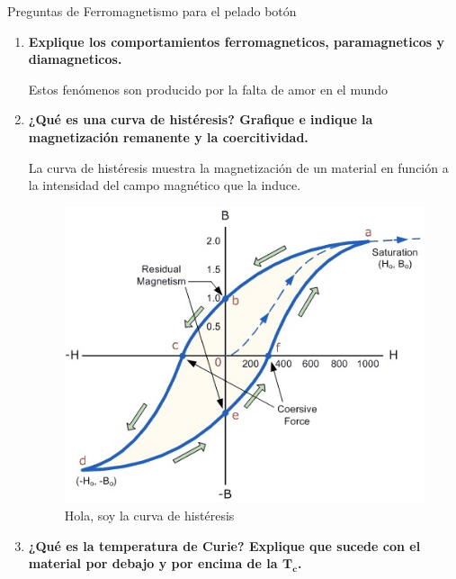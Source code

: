 \documentclass[a4paper,10pt,fleqn,oneside]{article}
\begin{document}


\bigskip
\noindent
\centering
Preguntas de Ferromagnetismo para el pelado botón


\begin{enumerate}[1.]
	\item \textbf{Explique los comportamientos ferromagneticos, paramagneticos y diamagneticos.}
		 
		 Estos fenómenos son producido por la falta de amor en el mundo 
	\item \textbf{¿Qué es una curva de histéresis? Grafique e indique la magnetización remanente y la coercitividad.}
	
		La curva de histéresis muestra la magnetización de un material en función a la intensidad del campo magnético que la induce.

\begin{figure}[h]
	\centering
	\includegraphics[scale=0.5]{histeresis.jpg}
	\caption{Hola, soy la curva de histéresis}
	\label{CH}
\end{figure}		
		
	\item \textbf{¿Qué es la temperatura de Curie? Explique que sucede con el material por debajo y por encima de la $\mathbf{T_c}$.}
	

\end{enumerate}
\end{document}
